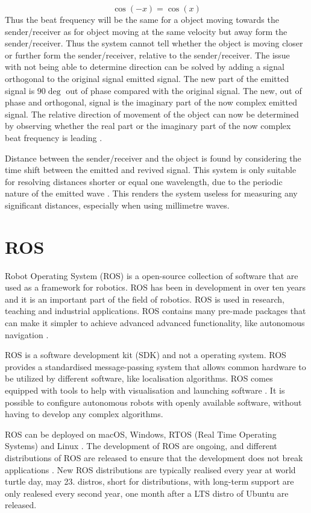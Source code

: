 \begin{equation} \label{eq:doppler}
    \cos(-x) = \cos(x)
\end{equation}
Thus the beat frequency will be the same for a object moving towards the sender/receiver as for object moving at the same velocity but away form the sender/receiver. Thus the system cannot tell whether the object is moving closer or further form the sender/receiver, relative to the sender/receiver. The issue with not being able to determine direction can be solved by adding a signal orthogonal to the original signal emitted signal. The new part of the emitted signal is $90 \deg$ out of phase compared with the original signal. The new, out of phase and orthogonal, signal is the imaginary part of the now complex emitted signal. The relative direction of movement of the object can now be determined by observing whether the real part or the imaginary part of the now complex beat frequency is leading \cite{douglas2022fmcw}.

Distance between the sender/receiver and the object is found by considering the time shift between the emitted and revived signal. This system is only suitable for resolving distances shorter or equal one wavelength, due to the periodic nature of the emitted wave \cite{douglas2022fmcw}. This renders the system useless for measuring any significant distances, especially when using millimetre waves.   

\section{ROS}
Robot Operating System (ROS) is a open-source collection of software that are used as a framework for robotics. ROS has been in development in over ten years and it is an important part of the field of robotics. ROS is used in research, teaching and industrial applications. ROS contains many pre-made packages that can make it simpler to achieve advanced advanced functionality, like autonomous navigation \cite{WhyROS}. 

ROS is a software development kit (SDK) and not a operating system. ROS provides a standardised message-passing system that allows common hardware to be utilized by different software, like localisation algorithms. ROS comes equipped with tools to help with visualisation and launching software \cite{ROSEcosystem}. It is possible to configure autonomous robots with openly available software, without having to develop any complex algorithms.

ROS can be deployed on macOS, Windows, RTOS (Real Time Operating Systems) and Linux \cite{WhyROS}. The development of ROS are ongoing, and different distributions of ROS are released to ensure that the development does not break applications \cite{REP2000}. New ROS distributions are typically realised every year at world turtle day, may 23. distros, short for distributions, with long-term support are only realesed every second year, one month after a LTS distro of Ubuntu are released. 


